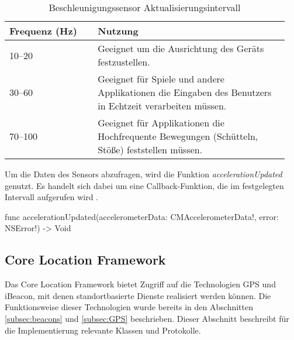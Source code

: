 \begin{table}[H]
\begin{tabular}{|p{0.3\linewidth}|p{0.65\linewidth}|}
\hline
\cellcolor[HTML]{C0C0C0}Frequenz (Hz) & \cellcolor[HTML]{C0C0C0} Nutzung                                                                                                                                                                   \\ \hline
10–20                & Geeignet um die Ausrichtung des Geräts festzustellen.                                                                                                         \\ \hline
\cellcolor[HTML]{EFEFEF}30–60                & \cellcolor[HTML]{EFEFEF} Geeignet für Spiele und andere Applikationen die Eingaben des Benutzers in Echtzeit verarbeiten müssen.
                                                                                  \\ \hline
70–100               & Geeignet für Applikationen die Hochfrequente Bewegungen (Schütteln, Stöße) feststellen müssen.  \\ \hline
\end{tabular}
\caption{Beschleunigungssensor Aktualisierungsintervall \cite{AppleAccelerometer:Online}}
\label{accelerometerInterval}
\end{table}

Um die Daten des Sensors abzufragen, wird die Funktion \textit{accelerationUpdated} genutzt. Es handelt sich dabei um eine Callback-Funktion, die im festgelegten Intervall aufgerufen wird \cite{AppleAccelerometer:Online}.
\begin{description}
  \item \textcolor{type}{func} accelerationUpdated(accelerometerData: \textcolor{parameter}{CMAccelerometerData!}, error: \textcolor{parameter}{NSError!}) -> \textcolor{parameter}{Void}
        \\[2mm]
\end{description}


\subsection{Core Location Framework}
\label{subsec:coreLocation}
Das Core Location Framework bietet Zugriff auf die Technologien \acs{GPS} und iBeacon, mit denen standortbasierte Dienste realisiert werden können. Die Funktionsweise dieser Technologien wurde bereits in den Abschnitten \ref{subsec:beacons} und \ref{subsec:GPS} beschrieben. Dieser Abschnitt beschreibt für die Implementierung relevante Klassen und Protokolle.

